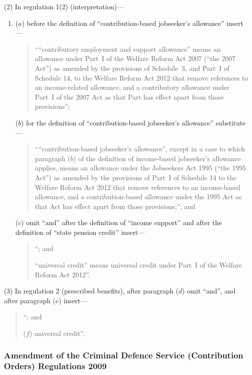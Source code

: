 \documentclass[12pt,a4paper]{article}
\begin{document}
(2) In regulation 1(2) (interpretation)—
\begin{enumerate}\item[]
($a$) before the definition of “contribution-based jobseeker’s allowance” insert—
\begin{quotation}
““contributory employment and support allowance” means an allowance under Part~I of the Welfare Reform Act 2007 (“the 2007 Act”) as amended by the provisions of Schedule~3, and Part~I of Schedule 14, to the Welfare Reform Act 2012 that remove references to an income-related allowance, and a contributory allowance under Part~I of the 2007 Act as that Part has effect apart from those provisions”;
\end{quotation}

($b$) for the definition of “contribution-based jobseeker’s allowance” substitute—
\begin{quotation}
““contribution-based jobseeker’s allowance”, except in a case to which paragraph ($b$)  of the definition of income-based jobseeker’s allowance applies, means an allowance under the Jobseekers Act 1995 (“the 1995 Act”) as amended by the provisions of Part~I of Schedule 14 to the Welfare Reform Act 2012 that remove references to an income-based allowance, and a contribution-based allowance under the 1995 Act as that Act has effect apart from those provisions;”; and
\end{quotation}

($c$) omit “and” after the definition of “income support” and after the definition of “state pension credit” insert—
\begin{quotation}
“; and 

“universal credit” means universal credit under Part~I of the Welfare Reform Act 2012”.
\end{quotation}
\end{enumerate}

(3) In regulation 2 (prescribed benefits), after paragraph ($d$)  omit “and”, and after paragraph ($e$)  insert—
\begin{quotation}
“; and

($f$) universal credit”.
\end{quotation}

\subsubsection[67. Amendment of the Criminal Defence Service (Contribution Orders) Regulations 2009]{Amendment of the Criminal Defence Service (Contribution Orders) Regulations 2009}
\end{document}

